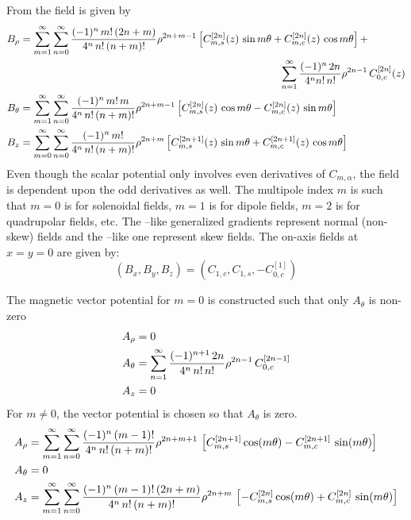 From  the field is given by
\begin{align}
  B_\rho   &= \sum_{m = 1}^{\infty} \sum_{n = 0}^\infty \frac{(-1)^n \, m! \, (2n+m)}{4^n \, n! \, (n+m)!}
    \rho^{2n+m-1} \left[ C^{[2n]}_{m,s}(z) \, \sin m\theta + C^{[2n]}_{m,c}(z) \, \cos m\theta \right] + \CRNO
    & \hspace{25 em} \sum_{n = 1}^\infty \frac{(-1)^n \, 2n}{4^n n! \, n!} \rho^{2n-1} \, C^{[2n]}_{0,c}(z) \CRNO
  B_\theta &= \sum_{m = 1}^{\infty} \sum_{n = 0}^\infty \frac{(-1)^n \, m! \, m}{4^n \, n! \, (n+m)!}
    \rho^{2n+m-1} \left[ C^{[2n]}_{m,s}(z) \, \cos m\theta - C^{[2n]}_{m,c}(z) \, \sin m\theta \right] \\
  B_z      &= \sum_{m = 0}^{\infty} \sum_{n = 0}^\infty \frac{(-1)^n \, m!}{4^n \, n! \, (n+m)!}
    \rho^{2n+m} \left[ C^{[2n+1]}_{m,s}(z) \, \sin m\theta + C^{[2n+1]}_{m,c}(z) \, \cos m\theta \right] \nonumber
\end{align}
Even though the scalar potential only involves even derivatives of $C_{m,\alpha}$, the field is
dependent upon the odd derivatives as well. The multipole index $m$ is such that $m = 0$ is for
solenoidal fields, $m = 1$ is for dipole fields, $m = 2$ is for quadrupolar fields, etc. The
--like generalized gradients represent normal (non-skew) fields and the --like one
represent skew fields. The on-axis fields at $x=y=0$ are given by:
\begin{equation}
  (B_x, B_y, B_z) = (C_{1,c}, C_{1,s}, -C^{[1]}_{0,c})
\end{equation}

The magnetic vector potential for $m = 0$ is constructed such that only $A_\theta$ is non-zero
\begin{align}
  A_\rho   &= 0 \nonumber \\
  A_\theta &= \sum_{n=1}^\infty 
    \frac{(-1)^{n+1} \, 2n}{4^n \, n! \, n!} \rho^{2n-1} \, C_{0,c}^{[2n-1]} \\
  A_z      &= 0 \nonumber
\end{align}
For $m \ne 0$, the vector potential is chosen so that $A_\theta$ is zero.
\begin{align}
  A_\rho   &= \sum_{m = 1}^{\infty} \sum_{n=0}^\infty 
    \frac{(-1)^{n} \, (m-1)!}{4^n \, n! \, (n+m)!} \rho^{2n+m+1} \, 
    \left[ C_{m,s}^{[2n+1]} \cos(m \theta) - C_{m,c}^{[2n+1]} \, \sin(m \theta) \right] \nonumber \\ 
  A_\theta &= 0 \\
  A_z      &= \sum_{m = 1}^{\infty} \sum_{n=0}^\infty 
    \frac{(-1)^n \, (m-1)! \, (2n+m)}{4^n \, n! \, (n+m)!} \rho^{2n+m} \, 
    \left[ -C_{m,s}^{[2n]} \cos(m \theta) + C_{m,c}^{[2n]} \, \sin(m \theta) \right]
  \nonumber
\end{align}

